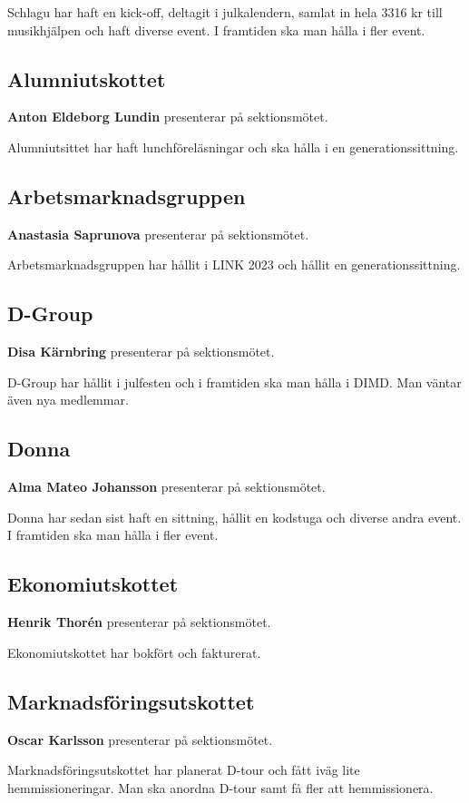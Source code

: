 \documentclass[../protokoll-vintermote-2024.tex]{subfiles}
\begin{document}
Schlagu har haft en kick-off, deltagit i julkalendern, samlat in hela 3316 kr till musikhjälpen och haft diverse event. I framtiden ska man hålla i fler event.

\subsection{Alumniutskottet}
\textbf{Anton Eldeborg Lundin} presenterar på sektionsmötet. 

Alumniutsittet har haft lunchföreläsningar och ska hålla i en generationssittning.

\subsection{Arbetsmarknadsgruppen}
\textbf{Anastasia Saprunova} presenterar på sektionsmötet. 

Arbetsmarknadsgruppen har hållit i LINK 2023 och hållit en generationssittning.

\subsection{D-Group}
\textbf{Disa Kärnbring} presenterar på sektionsmötet.

D-Group har hållit i julfesten och i framtiden ska man hålla i DIMD. Man väntar även nya medlemmar.

\subsection{Donna}
\textbf{Alma Mateo Johansson} presenterar på sektionsmötet.

Donna har sedan sist haft en sittning, hållit en kodstuga och diverse andra event. I framtiden ska man hålla i fler event.

\subsection{Ekonomiutskottet}
\textbf{Henrik Thorén} presenterar på sektionsmötet.

Ekonomiutskottet har bokfört och fakturerat.

\subsection{Marknadsföringsutskottet}
\textbf{Oscar Karlsson} presenterar på sektionsmötet.

Marknadsföringsutskottet har planerat D-tour och fått iväg lite hemmissioneringar. Man ska anordna D-tour samt få fler att hemmissionera.
\end{document}

